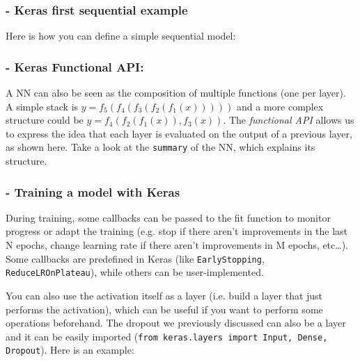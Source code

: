 \subsubsection{- Keras first sequential example}

Here is how you can define a simple sequential model:



\subsubsection{- Keras Functional API:}
A NN can also be seen as the composition of multiple functions (one per layer). A simple stack is $y = f_5(f_4(f_3(f_2(f_1(x)))))$ and a more complex structure could be $y = f_4(f_2(f_1(x)), f_3(x))$. 
The \textit{functional API} allows us to express the idea that each layer is evaluated on the output of a previous layer, as shown here. Take a look at the \texttt{summary} of the NN, which explains its structure.



\subsubsection{- Training a model with Keras}

During training, some callbacks can be passed to the fit function to monitor progress or adapt the training (e.g. stop if there aren't improvements in the last N epochs, change learning rate if there aren't improvements in M epochs, etc\dots). Some callbacks are predefined in Keras (like \texttt{EarlyStopping}, \texttt{ReduceLROnPlateau}), while others can be user-implemented. 

You can also use the activation itself as a layer (i.e. build a layer that just performs the activation), which can be useful if you want to perform some operations beforehand. The dropout we previously discussed can also be a layer and it can be easily imported (\texttt{from keras.layers import Input, Dense, Dropout}). Here is an example:

